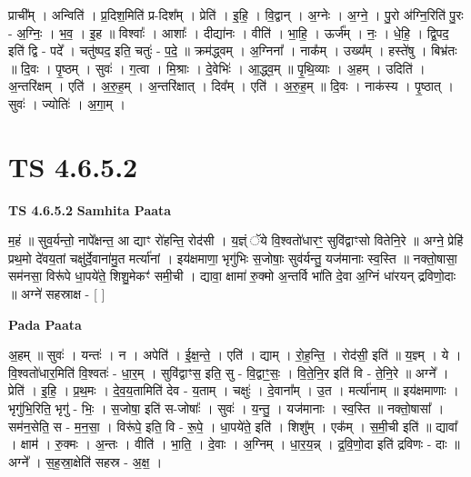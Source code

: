 \documentclass[17pt]{extarticle}
\begin{document}
प्राची᳚म् । अन्विति॑ । प्र॒दिश॒मिति॑ प्र-दिश᳚म् । प्रेति॑ । इ॒हि॒ । वि॒द्वान् । अ॒ग्नेः । अ॒ग्ने॒ । पु॒रो अ॑ग्नि॒रिति॑ पु॒रः - अ॒ग्निः॒ । भ॒व॒ । इ॒ह ॥ विश्वाः᳚ । आशाः᳚ । दीद्या॑नः । वीति॑ । भा॒हि॒ । ऊर्ज᳚म् । नः॒ । धे॒हि॒ । द्वि॒पद॒ इति॑ द्वि - पदे᳚ । चतु॑ष्पद॒ इति॒ चतुः॑ - प॒दे॒ ॥ क्रम॑द्ध्वम् । अ॒ग्निना᳚ । नाक᳚म् । उख्य᳚म् । हस्ते॑षु । बिभ्र॑तः ॥ दि॒वः । पृ॒ष्ठम् । सुवः॑ । ग॒त्वा । मि॒श्राः । दे॒वेभिः॑ । आ॒द्ध्व॒म् ॥ पृ॒थि॒व्याः । अ॒हम् । उदिति॑ । अ॒न्तरि॑क्षम् । एति॑ । अ॒रु॒ह॒म् । अ॒न्तरि॑क्षात् । दिव᳚म् । एति॑ । अ॒रु॒ह॒म् ॥ दि॒वः । नाक॑स्य । पृ॒ष्ठात् । सुवः॑ । ज्योतिः॑ । अ॒गा॒म् ।  \newline





\section{ TS 4.6.5.2 }

\textbf{TS 4.6.5.2 } \newline
\textbf{Samhita Paata} \newline

म॒हं ॥ सुव॒र्यन्तो॒ नापे᳚क्षन्त॒ आ द्याꣳ रो॑हन्ति॒ रोद॑सी । य॒ज्ञ्ं ॅये वि॒श्वतो॑धारꣳ॒॒ सुवि॑द्वाꣳसो वितेनि॒रे ॥ अग्ने॒ प्रेहि॑ प्रथ॒मो दे॑वय॒तां चक्षु॑र्दे॒वाना॑मु॒त मर्त्या॑नां । इय॑क्षमाणा॒ भृगु॑भिः स॒जोषाः॒ सुव॑र्यन्तु॒ यज॑मानाः स्व॒स्ति ॥ नक्तो॒षासा॒ सम॑नसा॒ विरू॑पे धा॒पये॑ते॒ शिशु॒मेकꣳ॑ समी॒ची । द्यावा॒ क्षामा॑ रु॒क्मो अ॒न्तर्वि भा॑ति दे॒वा अ॒ग्निं धा॑रयन् द्रविणो॒दाः ॥ अग्ने॑ सहस्राक्ष - [  ] \newline

\textbf{Pada Paata} \newline

अ॒हम् ॥ सुवः॑ । यन्तः॑ । न । अपेति॑ । ई॒क्ष॒न्ते॒ । एति॑ । द्याम् । रो॒ह॒न्ति॒ । रोद॑सी॒ इति॑ ॥ य॒ज्ञ्म् । ये । वि॒श्वतो॑धार॒मिति॑ वि॒श्वतः॑ - धा॒र॒म् । सुवि॑द्वाꣳस॒ इति॒ सु - वि॒द्वाꣳ॒॒सः॒ । वि॒ते॒नि॒र इति॑ वि - ते॒नि॒रे ॥ अग्ने᳚ । प्रेति॑ । इ॒हि॒ । प्र॒थ॒मः । दे॒व॒य॒तामिति॑ देव - य॒ताम् । चक्षुः॑ । दे॒वाना᳚म् । उ॒त । मर्त्या॑नाम् ॥ इय॑क्षमाणाः । भृगु॑भि॒रिति॒ भृगु॑ - भिः॒ । स॒जोषा॒ इति॑ स-जोषाः᳚ । सुवः॑ । य॒न्तु॒ । यज॑मानाः । स्व॒स्ति ॥ नक्तो॒षासा᳚ । सम॑न॒सेति॒ स - म॒न॒सा॒ । विरू॑पे॒ इति॒ वि - रू॒पे॒ । धा॒पये॑ते॒ इति॑ । शिशु᳚म् । एक᳚म् । स॒मी॒ची इति॑ ॥ द्यावा᳚ । क्षाम॑ । रु॒क्मः । अ॒न्तः । वीति॑ । भा॒ति॒ । दे॒वाः । अ॒ग्निम् । धा॒र॒य॒न्न् । द्र॒वि॒णो॒दा इति॑ द्रविणः - दाः ॥ अग्ने᳚ । स॒ह॒स्रा॒क्षेति॑ सहस्र - अ॒क्ष॒ ।  \newline
\end{document}

